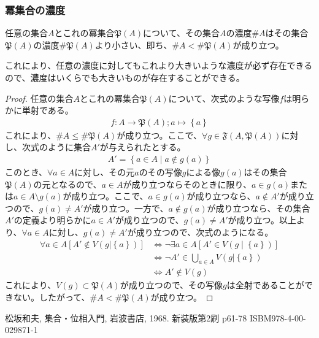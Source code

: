 \documentclass[dvipdfmx]{jsarticle}
\begin{document}
\subsubsection{冪集合の濃度}%
\begin{thm}\label{1.2.7.11}
任意の集合$A$とこれの冪集合$\mathfrak{P}(A)$について、その集合$A$の濃度$\# A$はその集合$\mathfrak{P}(A)の濃度\# {\mathfrak{P}(A)}$より小さい、即ち、$\# A < \# {\mathfrak{P}(A)}$が成り立つ。
\end{thm}\par
これにより、任意の濃度に対してもこれより大きいような濃度が必ず存在できるので、濃度はいくらでも大きいものが存在することができる。
\begin{proof}
任意の集合$A$とこれの冪集合$\mathfrak{P}(A)$について、次式のような写像$f$は明らかに単射である。
\begin{align*}
f:A \rightarrow \mathfrak{P}(A);a \mapsto \left\{ a \right\}
\end{align*}
これにより、$\# A \leq \# {\mathfrak{P}(A)}$が成り立つ。ここで、$\forall g \in \mathfrak{F}\left( A,\mathfrak{P}(A) \right)$に対し、次式のように集合$A'$が与えられたとする。
\begin{align*}
A' = \left\{ a \in A \middle| a \notin g(a) \right\}
\end{align*}
このとき、$\forall a \in A$に対し、その元$a$のその写像$g$による像$g(a)$はその集合$\mathfrak{P}(A)$の元となるので、$a \in A$が成り立つならそのときに限り、$a \in g(a)$または$a \in A \setminus g(a)$が成り立つ。ここで、$a \in g(a)$が成り立つなら、$a \notin A'$が成り立つので、$g(a) \neq A'$が成り立つ。一方で、$a \notin g(a)$が成り立つなら、その集合$A'$の定義より明らかに$a \in A'$が成り立つので、$g(a) \neq A'$が成り立つ。以上より、$\forall a \in A$に対し、$g(a) \neq A'$が成り立つので、次式のようになる。
\begin{align*}
\forall a \in A\left[ A' \notin V\left( g|\left\{ a \right\} \right) \right] &\Leftrightarrow \neg\exists a \in A\left[ A' \in V\left( g \middle| \left\{ a \right\} \right) \right]\\
&\Leftrightarrow \neg A' \in \bigcup_{a \in A} {V\left( g|\left\{ a \right\} \right)}\\
&\Leftrightarrow A' \notin V(g)
\end{align*}
これにより、$V(g)\subset \mathfrak{P}(A)$が成り立つので、その写像$g$は全射であることができない。したがって、$\# A < \# {\mathfrak{P}(A)}$が成り立つ。
\end{proof}
\begin{thebibliography}{50}
    松坂和夫, 集合・位相入門, 岩波書店, 1968. 新装版第2刷 p61-78 ISBM978-4-00-029871-1
\end{thebibliography}
\end{document}
